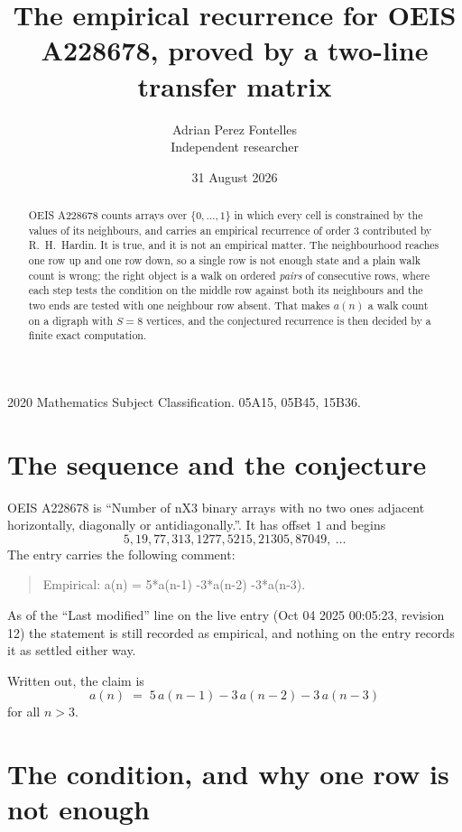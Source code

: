 \documentclass[11pt,a4paper]{article}
\title{The empirical recurrence for OEIS A228678, proved by a two-line transfer matrix}
\author{Adrian Perez Fontelles\\ \small Independent researcher}
\date{31 August 2026}
\theoremstyle{plain}
\theoremstyle{definition}
\begin{document}
\maketitle

\begin{abstract}
OEIS A228678 counts arrays over $\{0,\dots,1\}$ in which every cell is constrained by the
values of its neighbours, and carries an empirical recurrence of order $3$ contributed
by R.~H.~Hardin. It is true, and it is not an empirical matter. The neighbourhood reaches one
row up and one row down, so a single row is not enough state and a plain walk count
is wrong; the right object is a walk on ordered \emph{pairs} of consecutive rows, where
each step tests the condition on the middle row against both its neighbours and the two
ends are tested with one neighbour row absent. That makes $a(n)$ a walk count on a digraph
with $S=8$ vertices, and the conjectured recurrence is then decided by a finite exact
computation.
\end{abstract}

\noindent\small 2020 Mathematics Subject Classification. 05A15, 05B45, 15B36.\normalsize

\section{The sequence and the conjecture}

OEIS A228678 is ``Number of nX3 binary arrays with no two ones adjacent horizontally, diagonally or antidiagonally.''. It has offset $1$ and begins
\[
5, 19, 77, 313, 1277, 5215, 21305, 87049,\ \dots
\]
The entry carries the following comment:
\begin{quote}\small
Empirical: a(n) = 5*a(n-1) -3*a(n-2) -3*a(n-3).
\end{quote}
As of the ``Last modified'' line on the live entry (Oct 04 2025 00:05:23, revision 12) the statement is
still recorded as empirical, and nothing on the entry records it as settled either way.

Written out, the claim is
\begin{equation}\label{eq:conj}
a(n)\;=\;5\,a(n-1) - 3\,a(n-2) - 3\,a(n-3)
\end{equation}
for all $n>3$.

\section{The condition, and why one row is not enough}
\end{document}

